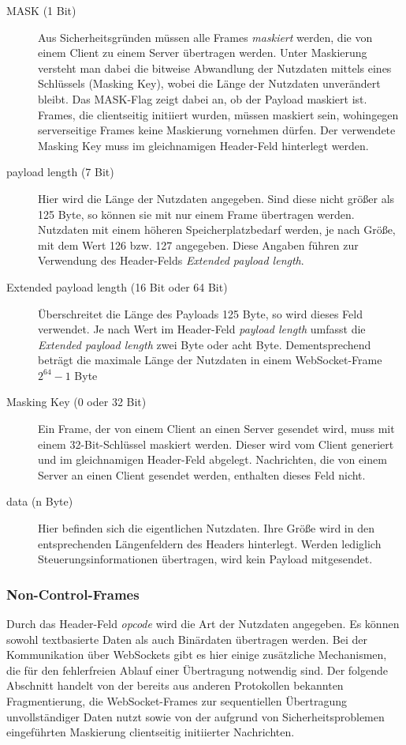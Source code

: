 \documentclass[11pt,a4paper,titlepage]{scrartcl}
\numberwithin{equation}{section}
\begin{document}
\begin{description}
\begin{itemize}
	\end{itemize}
	\item[MASK (1 Bit)] Aus Sicherheitsgründen müssen alle Frames \textit{maskiert} werden, die von einem Client zu einem Server übertragen werden. Unter Maskierung versteht man dabei die bitweise Abwandlung der Nutzdaten mittels eines Schlüssels (Masking Key), wobei die Länge der Nutzdaten unverändert bleibt. Das MASK-Flag zeigt dabei an, ob der  Payload maskiert ist. Frames, die clientseitig initiiert wurden, müssen maskiert sein, wohingegen serverseitige Frames keine Maskierung vornehmen dürfen. Der verwendete Masking Key muss im gleichnamigen Header-Feld hinterlegt werden.
	\item[payload length (7 Bit)] Hier wird die Länge der Nutzdaten angegeben. Sind diese nicht größer als 125 Byte, so können sie mit nur einem Frame übertragen werden. Nutzdaten mit einem höheren Speicherplatzbedarf werden, je nach Größe, mit dem Wert 126 bzw. 127 angegeben. Diese Angaben führen zur Verwendung des Header-Felds \textit{Extended payload length}.
	\item[Extended payload length (16 Bit oder 64 Bit)] Überschreitet die Länge des Payloads 125 Byte, so wird dieses Feld verwendet. Je nach Wert im Header-Feld \textit{payload length} umfasst die \textit{Extended payload length} zwei Byte oder acht Byte. Dementsprechend beträgt die maximale Länge der Nutzdaten in einem WebSocket-Frame $2^{64} - 1$ Byte \autocite[41]{gorski_websockets_2015}
	\item[Masking Key (0 oder 32 Bit)] Ein Frame, der von einem Client an einen Server gesendet wird, muss mit einem 32-Bit-Schlüssel maskiert werden. Dieser wird vom Client generiert und im gleichnamigen Header-Feld abgelegt. Nachrichten, die von einem Server an einen Client gesendet werden, enthalten dieses Feld nicht.
	\item[data (n Byte)] Hier befinden sich die eigentlichen Nutzdaten. Ihre Größe wird in den entsprechenden Längenfeldern des Headers hinterlegt. Werden lediglich Steuerungsinformationen übertragen, wird kein Payload mitgesendet.
\end{description}

\subsubsection{Non-Control-Frames}\label{subsubsec:wsNCFrames} 
Durch das Header-Feld \textit{opcode} wird die Art der Nutzdaten angegeben. Es können sowohl textbasierte Daten als auch Binärdaten übertragen werden. Bei der Kommunikation über WebSockets gibt es hier einige zusätzliche Mechanismen, die für den fehlerfreien Ablauf einer Übertragung notwendig sind. Der folgende Abschnitt handelt von der bereits aus anderen Protokollen bekannten Fragmentierung, die WebSocket-Frames zur sequentiellen Übertragung unvollständiger Daten nutzt sowie von der aufgrund von Sicherheitsproblemen eingeführten Maskierung clientseitig initiierter Nachrichten.
\end{document}
